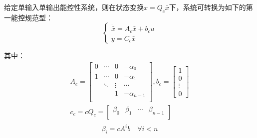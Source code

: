 \begin{theorem}[第一能控性规范型]
    给定单输入单输出能控性系统，则在状态变换$x = Q_c \bar{x}$下，系统可转换为如下的第一能控规范型：
    \begin{equation*}
        \begin{cases}
            \dot{\bar{x}} = A_c \bar{x} + b_c u \\
            y = C_c \bar{x}
        \end{cases}
    \end{equation*}

    其中：
    \begin{equation*}
        \begin{split}
            A_c =  \begin{bmatrix}
            0 & \cdots & 0 & -\alpha_0 \\
            1 & \cdots & 0 & -\alpha_1 \\
              & \ddots & \vdots & \cdots \\
              & & 1 & -\alpha_{n-1} \\
        \end{bmatrix} , b_c = \begin{bmatrix}
            1 \\ 0 \\ \vdots \\ 0
        \end{bmatrix}  \\
        c_c = cQ_c = \begin{bmatrix}
            \beta_0 & \beta_1 & \cdots & \beta_{n-1} \\
        \end{bmatrix}\\
        \end{split}
    \end{equation*}
    \begin{equation*}
        \beta_i = c A^i b \quad \forall i < n
    \end{equation*}
\end{theorem}

